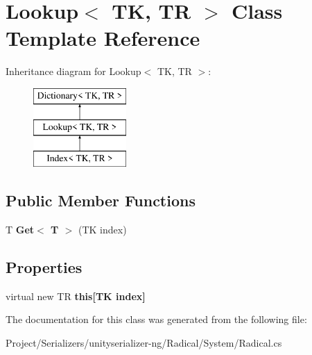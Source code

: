 \hypertarget{class_lookup}{}\section{Lookup$<$ TK, TR $>$ Class Template Reference}
\label{class_lookup}
Inheritance diagram for Lookup$<$ TK, TR $>$\+:\begin{figure}[H]
\begin{center}
\leavevmode
\includegraphics[height=3.000000cm]{class_lookup}
\end{center}
\end{figure}
\subsection*{Public Member Functions}
\begin{DoxyCompactItemize}
\item 
\mbox{\label{class_lookup_a6dacd9aa4eb48983ebdce15553bc16ca}} 
T {\bfseries Get$<$ T $>$} (TK index)
\end{DoxyCompactItemize}
\subsection*{Properties}
\begin{DoxyCompactItemize}
\item 
\mbox{\label{class_lookup_a967e8091a6869de2da08ebf3b8cccf8a}} 
virtual new TR {\bfseries this\mbox{[}\+T\+K index\mbox{]}}
\end{DoxyCompactItemize}


The documentation for this class was generated from the following file\+:\begin{DoxyCompactItemize}
\item 
Project/\+Serializers/unityserializer-\/ng/\+Radical/\+System/Radical.\+cs\end{DoxyCompactItemize}
